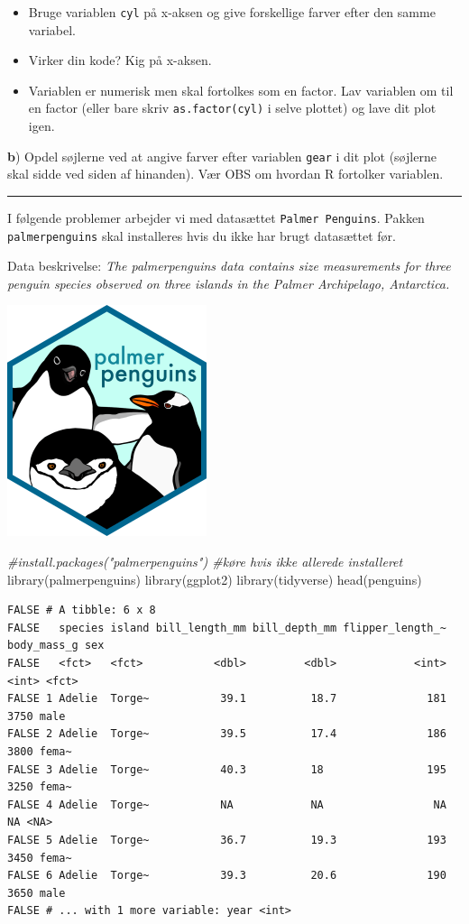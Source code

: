 \documentclass[
]{book}
\newenvironment{Shaded}{\begin{snugshade}}{\end{snugshade}}
\newcommand{\CommentTok}[1]{\textcolor[rgb]{0.56,0.35,0.01}{\textit{#1}}}
\newcommand{\FunctionTok}[1]{\textcolor[rgb]{0.00,0.00,0.00}{#1}}
\newcommand{\NormalTok}[1]{#1}
\providecommand{\tightlist}{%
  \setlength{\itemsep}{0pt}\setlength{\parskip}{0pt}}
\begin{document}
\begin{itemize}
\tightlist
\item
  Bruge variablen \texttt{cyl} på x-aksen og give forskellige farver efter den samme variabel.
\item
  Virker din kode? Kig på x-aksen.
\item
  Variablen er numerisk men skal fortolkes som en factor. Lav variablen om til en factor (eller bare skriv \texttt{as.factor(cyl)} i selve plottet) og lave dit plot igen.
\end{itemize}

\textbf{b}) Opdel søjlerne ved at angive farver efter variablen \texttt{gear} i dit plot (søjlerne skal sidde ved siden af hinanden). Vær OBS om hvordan R fortolker variablen.

\begin{center}\rule{0.5\linewidth}{0.5pt}\end{center}

I følgende problemer arbejder vi med datasættet \texttt{Palmer\ Penguins}. Pakken \texttt{palmerpenguins} skal installeres hvis du ikke har brugt datasættet før.

Data beskrivelse: \emph{The palmerpenguins data contains size measurements for three penguin species observed on three islands in the Palmer Archipelago, Antarctica.}

\includegraphics[width=0.2\linewidth]{plots/palmerpenguins}

\begin{Shaded}
\begin{Highlighting}[]
\CommentTok{\#install.packages("palmerpenguins") \#køre hvis ikke allerede installeret}
\FunctionTok{library}\NormalTok{(palmerpenguins)}
\FunctionTok{library}\NormalTok{(ggplot2)}
\FunctionTok{library}\NormalTok{(tidyverse)}
\FunctionTok{head}\NormalTok{(penguins)}
\end{Highlighting}
\end{Shaded}

\begin{verbatim}
FALSE # A tibble: 6 x 8
FALSE   species island bill_length_mm bill_depth_mm flipper_length_~ body_mass_g sex  
FALSE   <fct>   <fct>           <dbl>         <dbl>            <int>       <int> <fct>
FALSE 1 Adelie  Torge~           39.1          18.7              181        3750 male 
FALSE 2 Adelie  Torge~           39.5          17.4              186        3800 fema~
FALSE 3 Adelie  Torge~           40.3          18                195        3250 fema~
FALSE 4 Adelie  Torge~           NA            NA                 NA          NA <NA> 
FALSE 5 Adelie  Torge~           36.7          19.3              193        3450 fema~
FALSE 6 Adelie  Torge~           39.3          20.6              190        3650 male 
FALSE # ... with 1 more variable: year <int>
\end{verbatim}
\end{document}
